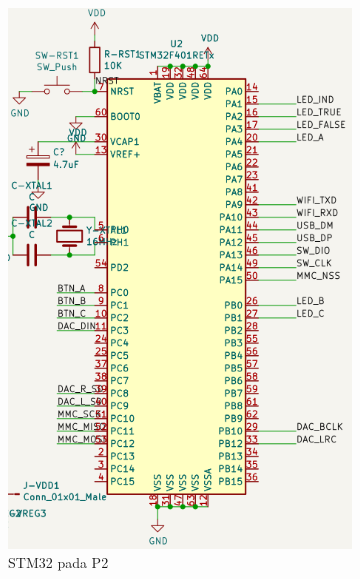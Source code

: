 \documentclass{book} %
\begin{document}
    \begin{figure}[!ht]
    	\centering
    	\begin{subfigure}[t]{0.25\textwidth}
    		\includegraphics[width=\textwidth]{images/p2_stm32}
    		\caption{STM32 pada P2}
    	\end{subfigure}
    	\begin{subfigure}[t]{0.40\textwidth}

\end{subfigure}
\end{figure}
\end{document}
